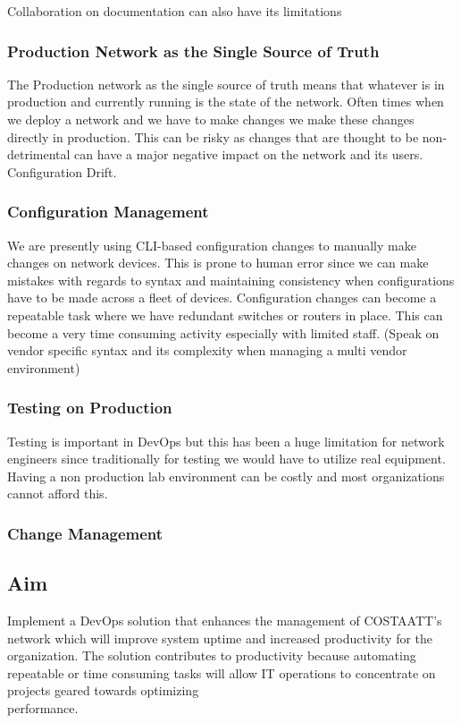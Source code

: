 \documentclass[12pt, letterpaper]{article}
\begin{document}
\medskip

Collaboration on documentation can also have its limitations 




	\subsubsection{Production Network as the Single Source of Truth}
The Production network as the single source of truth means that whatever is in production and currently running is the state of the network. Often times when we deploy a network and we have to make changes we make these changes directly in production. This can be risky as changes that are thought to be non-detrimental can have a major negative impact on the network and its users. 
Configuration Drift.
	
	\subsubsection{Configuration Management}
We are presently using CLI-based configuration changes to manually make changes on network devices. This is prone to human error since we can make mistakes with regards to syntax and maintaining consistency when configurations have to be made across a fleet of devices. Configuration changes can become a repeatable task where we have redundant switches or routers in place. This can become a very time consuming activity especially with limited staff. (Speak on vendor specific syntax and its complexity when managing a multi vendor environment)
	
	\subsubsection{Testing on Production}
Testing is important in DevOps but this has been a huge limitation for network engineers since traditionally for testing we would have to utilize real equipment. Having a non production lab environment can be costly and most organizations cannot afford this. 
	
	\subsubsection{Change Management}


	\subsection{Aim}
Implement a DevOps solution that enhances the management of COSTAATT's network which will improve system uptime and increased productivity for the organization. The solution contributes to productivity because automating repeatable or time consuming tasks will allow IT operations to concentrate on projects geared towards optimizing \\ performance.
\end{document}
